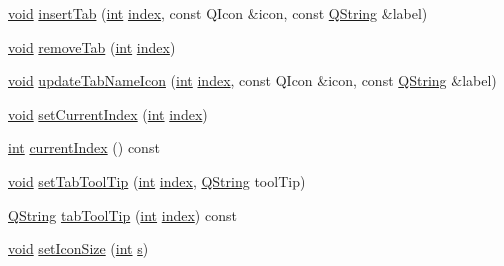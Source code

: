 \begin{DoxyCompactItemize}
\hyperlink{group___u_a_v_objects_plugin_ga444cf2ff3f0ecbe028adce838d373f5c}{void} \hyperlink{group___core_plugin_ga2be27a6b256583dba3135713105716d7}{insert\-Tab} (\hyperlink{ioapi_8h_a787fa3cf048117ba7123753c1e74fcd6}{int} \hyperlink{glext_8h_ab47dd9958bcadea08866b42bf358e95e}{index}, const Q\-Icon \&icon, const \hyperlink{group___u_a_v_objects_plugin_gab9d252f49c333c94a72f97ce3105a32d}{Q\-String} \&label)
\item 
\hyperlink{group___u_a_v_objects_plugin_ga444cf2ff3f0ecbe028adce838d373f5c}{void} \hyperlink{group___core_plugin_ga7d95a77577d78a5b71c4ef00a84f64e6}{remove\-Tab} (\hyperlink{ioapi_8h_a787fa3cf048117ba7123753c1e74fcd6}{int} \hyperlink{glext_8h_ab47dd9958bcadea08866b42bf358e95e}{index})
\item 
\hyperlink{group___u_a_v_objects_plugin_ga444cf2ff3f0ecbe028adce838d373f5c}{void} \hyperlink{group___core_plugin_ga2395ca4b2340f7f5e54d4fada4e0e929}{update\-Tab\-Name\-Icon} (\hyperlink{ioapi_8h_a787fa3cf048117ba7123753c1e74fcd6}{int} \hyperlink{glext_8h_ab47dd9958bcadea08866b42bf358e95e}{index}, const Q\-Icon \&icon, const \hyperlink{group___u_a_v_objects_plugin_gab9d252f49c333c94a72f97ce3105a32d}{Q\-String} \&label)
\item 
\hyperlink{group___u_a_v_objects_plugin_ga444cf2ff3f0ecbe028adce838d373f5c}{void} \hyperlink{group___core_plugin_gabf70f3132174e9d8c21315e2684150de}{set\-Current\-Index} (\hyperlink{ioapi_8h_a787fa3cf048117ba7123753c1e74fcd6}{int} \hyperlink{glext_8h_ab47dd9958bcadea08866b42bf358e95e}{index})
\item 
\hyperlink{ioapi_8h_a787fa3cf048117ba7123753c1e74fcd6}{int} \hyperlink{group___core_plugin_ga1c8e8bf3903f524c59131dcabb31a913}{current\-Index} () const 
\item 
\hyperlink{group___u_a_v_objects_plugin_ga444cf2ff3f0ecbe028adce838d373f5c}{void} \hyperlink{group___core_plugin_gaeb89740bb137bced7ecb998d565ecc5f}{set\-Tab\-Tool\-Tip} (\hyperlink{ioapi_8h_a787fa3cf048117ba7123753c1e74fcd6}{int} \hyperlink{glext_8h_ab47dd9958bcadea08866b42bf358e95e}{index}, \hyperlink{group___u_a_v_objects_plugin_gab9d252f49c333c94a72f97ce3105a32d}{Q\-String} tool\-Tip)
\item 
\hyperlink{group___u_a_v_objects_plugin_gab9d252f49c333c94a72f97ce3105a32d}{Q\-String} \hyperlink{group___core_plugin_gad418288c9fa961c782d6bf2171180bec}{tab\-Tool\-Tip} (\hyperlink{ioapi_8h_a787fa3cf048117ba7123753c1e74fcd6}{int} \hyperlink{glext_8h_ab47dd9958bcadea08866b42bf358e95e}{index}) const 
\item 
\hyperlink{group___u_a_v_objects_plugin_ga444cf2ff3f0ecbe028adce838d373f5c}{void} \hyperlink{group___core_plugin_ga0a48234ad92fee352aaaef4796c49892}{set\-Icon\-Size} (\hyperlink{ioapi_8h_a787fa3cf048117ba7123753c1e74fcd6}{int} \hyperlink{glext_8h_ad585a1393cfa368fa9dc3d8ebff640d5}{s})

\end{DoxyCompactItemize}
